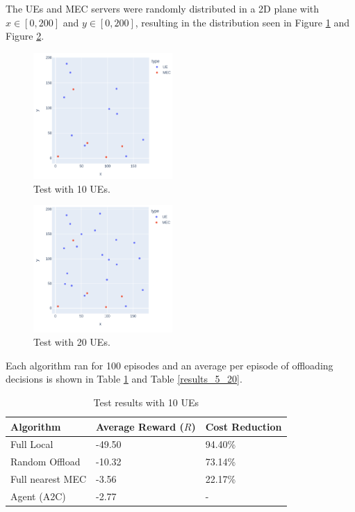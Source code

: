 \documentclass[conference]{IEEEtran}
\begin{document}
The UEs and MEC servers were randomly distributed in a 2D plane with $x \in [0, 200]$ and $y \in [0, 200]$, resulting in the distribution seen in Figure \ref{5_10_layout} and Figure \ref{5_20_layout}.

\begin{figure}[H]
  \centering
  \includegraphics[width=200px]{images/5_10_layout.png}
  \caption{Test with 10 \acrshort{UE}s.}  \label{5_10_layout}
\end{figure}
\begin{figure}[H]
  \centering
  \includegraphics[width=200px]{images/5_20_layout.png}
  \caption{Test with 20 \acrshort{UE}s.}  \label{5_20_layout}
\end{figure}

Each algorithm ran for 100 episodes and an average per episode of offloading decisions is shown in Table \ref{results_5_10} and Table \ref{results_5_20}.

\begin{table}[H]
\centering
\begin{tabular}{|l|l|l|}
\hline
Algorithm        & Average Reward ($R$) & Cost Reduction\\ \hline
Full Local       & -49.50 & 94.40\%\\
Random Offload   & -10.32 & 73.14\%\\
Full nearest MEC & -3.56 & 22.17\%\\ 
Agent (A2C) & -2.77 & -\\ \hline
\end{tabular}
\caption{Test results with 10 \acrshort{UE}s} \label{results_5_10}
\end{table}
\end{document}
